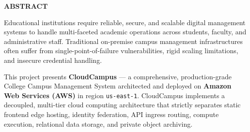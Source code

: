 \newpage
\thispagestyle{plain}

\begin{center}
{\LARGE \bfseries \color{primaryblue} ABSTRACT}\\[0.6cm]
\end{center}

\noindent Educational institutions require reliable, secure, and scalable digital management systems to handle multi-faceted academic operations across students, faculty, and administrative staff. Traditional on-premise campus management infrastructures often suffer from single-point-of-failure vulnerabilities, rigid scaling limitations, and insecure credential handling. 

This project presents \textbf{CloudCampus} --- a comprehensive, production-grade College Campus Management System architected and deployed on \textbf{Amazon Web Services (AWS)} in region \texttt{us-east-1}. CloudCampus implements a decoupled, multi-tier cloud computing architecture that strictly separates static frontend edge hosting, identity federation, API ingress routing, compute execution, relational data storage, and private object archiving.

